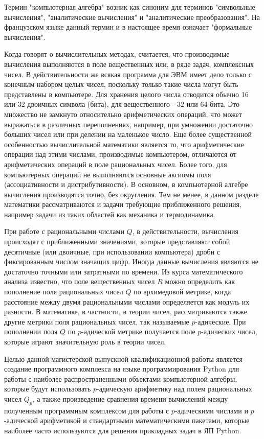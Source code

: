 \documentclass[master, och, diploma, times]{sty/SCWorks}
\theoremstyle{plain}
\theoremstyle{definition}
\numberwithin{equation}{section}
\begin{document}
Термин "компьютерная алгебра" возник как синоним для терминов "символьные вычисления", "аналитические вычисления" и "аналитические преобразования". На французском языке данный термин и в настоящее время означает "формальные вычисления".

Когда говорят о вычислительных методах, считается, что производимые вычисления выполняются в поле вещественных или, в ряде задач, комплексных чисел. В действительности же всякая программа для ЭВМ имеет дело только с конечным набором целых чисел, поскольку только такие числа могут быть представлены в компьютере. Для хранения целого числа отводится обычно 16 или 32 двоичных символа (бита), для вещественного - 32 или 64 бита. Это множество не замкнуто относительно арифметических операций, что может выражаться в различных переполнениях, например, при умножении достаточно больших чисел или при делении на маленькое число. Еще более  существенной особенностью вычислительной математики является то, что арифметические операции над этими числами, производимые компьютером, отличаются от арифметических операций в поле рациональных чисел. Более того, для компьютерных операций не выполняются основные аксиомы поля (ассоциативности и дистрибутивности). В основном, в компьютерной алгебре вычисления производятся точно, без округления. Тем не менее, в данном разделе математики рассматриваются и задачи требующие приближенного решения, например задачи из таких областей как механика и термодинамика. 
 
При работе с рациональными числами $Q$, в действительности, вычисления происходят с приближенными значениями, которые представляют собой десятичные (или двоичные, при использовании компьютера) дроби с фиксированным числом значащих цифр.  Иногда данные вычисления являются не достаточно точными или затратными по времени. 
Из курса математического анализа известно, что поле вещественных чисел $R$ можно определить как пополнение поля рациональных чисел $Q$ по архимедовой метрике, когда расстояние между двумя рациональными числами определяется как модуль их разности. В математике, в частности, в теории чисел, рассматриваются также другие метрики поля рациональных чисел, так называемые $p$-адические. При пополнении поля $Q$ по $p$-адической метрике получается поле $p$-адических чисел, которые играют значительную роль в теории чисел.
 

Целью данной магистерской выпускной квалификационной работы является создание программного комплекса на языке программирования Python для работы с наиболее распространенными объектами компьютерной алгебры, которые будут использовать $p$-адическую арифметику над полем рациональных чисел $Q_p$, а также произведение сравнения времени вычислений между полученным программным комплексом для работы с $p$-адическими числами и $p$-адической арифметикой и стандартными математическими пакетами, которые наиболее часто используются для решения прикладных задач в ЯП Python.
\end{document}
